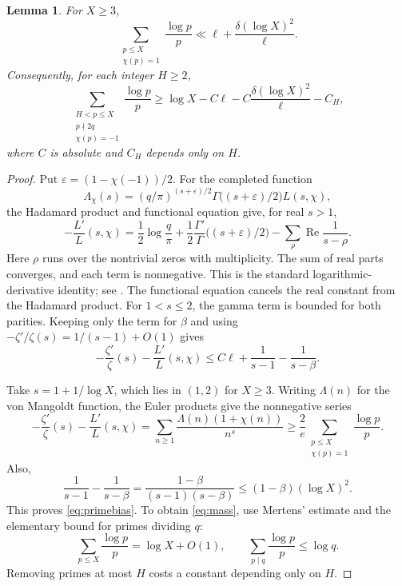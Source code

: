 \documentclass[11pt,a4paper]{amsart}
\newtheorem{lemma}[theorem]{Lemma}
\theoremstyle{remark}
\numberwithin{equation}{section}
\begin{document}
\begin{lemma}\label{lem:primebias}
For $X\ge3$,
\begin{equation}\label{eq:primebias}
 \sum_{\substack{p\le X\\\chi(p)=1}}\frac{\log p}{p}
 \ll \ell+\frac{\delta(\log X)^2}{\ell}.
\end{equation}
Consequently, for each integer $H\ge2$,
\begin{equation}\label{eq:mass}
 \sum_{\substack{H<p\le X\\p\nmid2q\\\chi(p)=-1}}
     \frac{\log p}{p}
 \ge \log X-C\ell-C\frac{\delta(\log X)^2}{\ell}-C_H,
\end{equation}
where $C$ is absolute and $C_H$ depends only on $H$.
\end{lemma}

\begin{proof}
Put $\varepsilon=(1-\chi(-1))/2$. For the completed function
\[
 \Lambda_\chi(s)=
 (q/\pi)^{(s+\varepsilon)/2}
 \Gamma\bigl((s+\varepsilon)/2\bigr)L(s,\chi),
\]
the Hadamard product and functional equation give, for real $s>1$,
\begin{equation}\label{eq:hadamard}
 -\frac{L'}{L}(s,\chi)
 =\frac12\log\frac q\pi
  +\frac12\frac{\Gamma'}{\Gamma}
        \bigl((s+\varepsilon)/2\bigr)
  -\sum_\rho\operatorname{Re}\frac1{s-\rho}.
\end{equation}
Here $\rho$ runs over the nontrivial zeros with multiplicity. The sum
of real parts converges, and each term is nonnegative. This is the
standard logarithmic-derivative identity; see
\cite[Sections~12 and 14]{Davenport}. The functional equation cancels
the real constant from the Hadamard product. For $1<s\le2$, the gamma
term is bounded for both parities. Keeping only the term for $\beta$
and using $-\zeta'/\zeta(s)=1/(s-1)+O(1)$ gives
\begin{equation}\label{eq:logderivative}
 -\frac{\zeta'}{\zeta}(s)-\frac{L'}{L}(s,\chi)
 \le C\ell+\frac1{s-1}-\frac1{s-\beta}.
\end{equation}

Take $s=1+1/\log X$, which lies in $(1,2)$ for $X\ge3$.
Writing $\Lambda(n)$ for the von Mangoldt function, the Euler
products give the nonnegative series
\[
 -\frac{\zeta'}{\zeta}(s)-\frac{L'}{L}(s,\chi)
 =\sum_{n\ge1}\frac{\Lambda(n)(1+\chi(n))}{n^s}
 \ge\frac2e\sum_{\substack{p\le X\\\chi(p)=1}}\frac{\log p}{p}.
\]
Also,
\[
 \frac1{s-1}-\frac1{s-\beta}
 =\frac{1-\beta}{(s-1)(s-\beta)}
 \le(1-\beta)(\log X)^2.
\]
This proves \eqref{eq:primebias}. To obtain \eqref{eq:mass}, use
Mertens' estimate and the elementary bound for primes dividing $q$:
\[
 \sum_{p\le X}\frac{\log p}{p}=\log X+O(1),
 \qquad \sum_{p\mid q}\frac{\log p}{p}\le\log q.
\]
Removing primes at most $H$ costs a constant depending only on $H$.
\end{proof}
\end{document}
